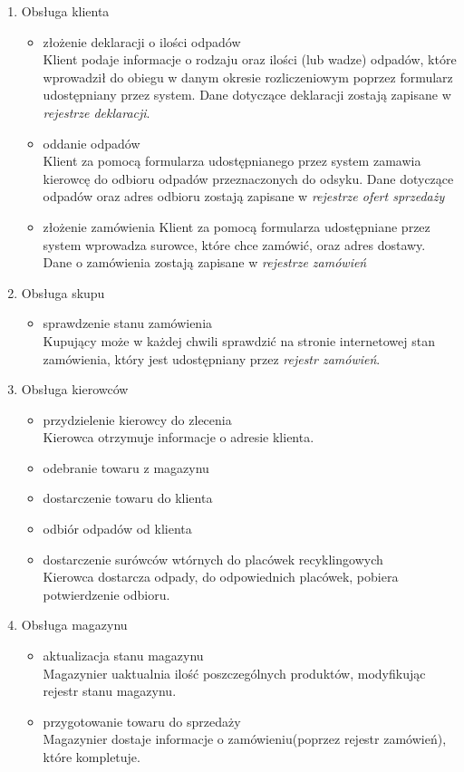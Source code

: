 
\begin{enumerate}
	\item Obsługa klienta
		\begin{itemize}
			\item złożenie deklaracji o ilości odpadów \\
			Klient podaje informacje o rodzaju oraz ilości (lub wadze) odpadów, które wprowadził do obiegu w danym okresie rozliczeniowym poprzez formularz udostępniany przez system. Dane dotyczące deklaracji zostają zapisane w \emph{rejestrze deklaracji}.
			\item oddanie odpadów \\
			Klient za pomocą formularza udostępnianego przez system zamawia kierowcę do odbioru odpadów przeznaczonych do odsyku.
			Dane dotyczące odpadów oraz adres odbioru zostają zapisane w \emph{rejestrze ofert sprzedaży}
			\item złożenie zamówienia
			Klient za pomocą formularza udostępniane przez system wprowadza surowce, które chce zamówić, oraz adres dostawy. Dane o zamówienia zostają zapisane w \emph{rejestrze zamówień}
		\end{itemize}

	\item Obsługa skupu
		\begin{itemize}
			\item sprawdzenie stanu zamówienia \\ 
			Kupujący może w każdej chwili sprawdzić na stronie internetowej stan zamówienia, który jest udostępniany przez \emph{rejestr zamówień}.
		\end{itemize}

	\item Obsługa kierowców 
		\begin{itemize}
			\item przydzielenie kierowcy do zlecenia \\
			Kierowca otrzymuje informacje o adresie klienta.
			\item odebranie towaru z magazynu 
			\item dostarczenie towaru do klienta
			\item odbiór odpadów od klienta
			\item dostarczenie surówców wtórnych do placówek recyklingowych \\
			Kierowca dostarcza odpady, do odpowiednich placówek, pobiera potwierdzenie odbioru.
		\end{itemize}

	\item Obsługa magazynu
		\begin{itemize}
		\item aktualizacja stanu magazynu \\
	 	Magazynier uaktualnia ilość poszczególnych produktów, modyfikując rejestr stanu magazynu.
	 	\item przygotowanie towaru do sprzedaży \\
	 	Magazynier dostaje informacje o zamówieniu(poprzez rejestr zamówień), które kompletuje.
		\end{itemize}


\end{enumerate}
